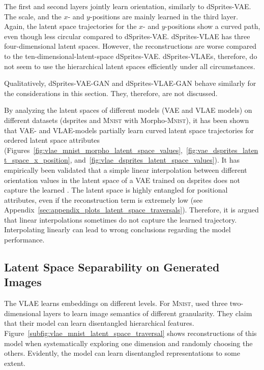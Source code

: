 The first and second layers jointly learn orientation, similarly to dSprites-\ac{VAE}.
The scale, and the $x$- and $y$-positions are mainly learned in the third layer.
Again, the latent space trajectories for the $x$- and $y$-positions show a curved path, even though less circular compared to dSprites-\ac{VAE}.
dSprites-\ac{VLAE} has three four-dimensional latent spaces.
However, the reconstructions are worse compared to the ten-dimensional-latent-space dSprites-\ac{VAE}.
dSprites-\acp{VLAE}, therefore, do not seem to use the hierarchical latent spaces efficiently under all circumstances.

Qualitatively, dSprites-\ac{VAE}-\ac{GAN} and dSprites-\ac{VLAE}-\ac{GAN} behave similarly for the considerations in this section.
They, therefore, are not discussed.

By analyzing the latent spaces of different models (\ac{VAE} and \ac{VLAE} models) on different datasets (dsprites and \textsc{Mnist} with Morpho-\textsc{Mnist}), it has been shown that \ac{VAE}- and \ac{VLAE}-models partially learn curved latent space trajectories for ordered latent space attributes (Figures~\ref{fig:vlae_mnist_morpho_latent_space_values},~\ref{fig:vae_dsprites_latent_space_x_position}, and~\ref{fig:vlae_dsprites_latent_space_values}).
It has empirically been validated that a simple linear interpolation between different orientation values in the latent space of a \ac{VAE} trained on dsprites does not capture the learned .
The latent space is highly entangled for positional attributes, even if the reconstruction term is extremely low (see Appendix~\ref{sec:appendix_plots_latent_space_traversals}).
Therefore, it is argued that linear interpolations sometimes do not capture the learned trajectory.
Interpolating linearly can lead to wrong conclusions regarding the model performance.


\subsection{Latent Space Separability on Generated Images}\label{subsec:independence-of-vlae-embeddings}

The VLAE learns embeddings on different levels.
For \textsc{Mnist}, \citet{zhao2017learning} used three two-dimensional layers to learn image semantics of different granularity.
They claim that their model can learn disentangled hierarchical features.
Figure~\ref{subfig:vlae_mnist_latent_space_traversal} shows reconstructions of this model when systematically exploring one dimension and randomly choosing the others.
Evidently, the model can learn disentangled representations to some extent.

